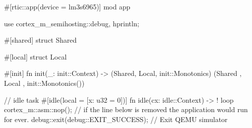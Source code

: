 #[rtic::app(device = lm3s6965)]
mod app {
    use cortex_m_semihosting::{debug, hprintln};

    #[shared]
    struct Shared {}

    #[local]
    struct Local {}

    #[init]
    fn init(_: init::Context) -> (Shared, Local, init::Monotonics) {
        (Shared {}, Local {}, init::Monotonics())
    }

    // idle task 
    #[idle(local = [x: u32 = 0])]
    fn idle(cx: idle::Context) -> ! {
        loop {
            cortex_m::asm::nop();
            // if the line below is removed the application would run for ever.
            debug::exit(debug::EXIT_SUCCESS); // Exit QEMU simulator
        }
    }
}
